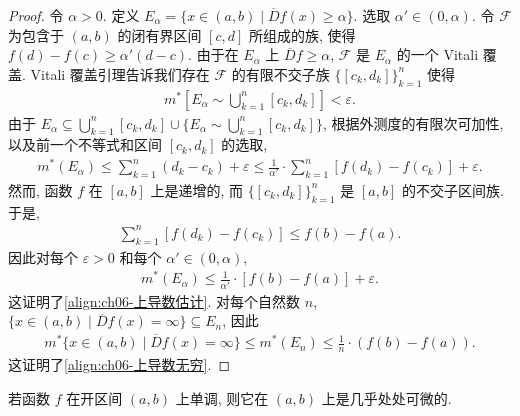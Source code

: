 \documentclass[../../main.tex]{subfiles}
\begin{document}
\begin{proof}
令 $\alpha>0$. 定义 $E_{\alpha}=\{x\in(a,b)\mid\overline{D}f(x)\geqslant\alpha\}$. 选取 $\alpha'\in(0,\alpha)$. 令 $\mathcal{F}$ 为包含于 $(a,b)$ 的闭有界区间 $[c,d]$ 所组成的族, 使得 $f(d)-f(c)\geqslant\alpha'(d-c)$. 由于在 $E_{\alpha}$ 上 $\overline{D}f\geqslant\alpha$, $\mathcal{F}$ 是 $E_{\alpha}$ 的一个 Vitali 覆盖. Vitali 覆盖引理告诉我们存在 $\mathcal{F}$ 的有限不交子族 $\{[c_{k},d_{k}]\}_{k=1}^{n}$ 使得
\begin{align*}
m^{*}\left[E_{\alpha}\sim\bigcup_{k=1}^{n}[c_{k},d_{k}]\right]<\varepsilon.
\end{align*}
由于 $E_{\alpha}\subseteq\bigcup_{k=1}^{n}[c_{k},d_{k}]\cup\{E_{\alpha}\sim\bigcup_{k=1}^{n}[c_{k},d_{k}]\}$, 根据外测度的有限次可加性, 以及前一个不等式和区间 $[c_{k},d_{k}]$ 的选取,
\begin{align}
m^{*}(E_{\alpha})\leqslant\sum_{k=1}^{n}(d_{k}-c_{k})+\varepsilon\leqslant\frac{1}{\alpha'}\cdot\sum_{k=1}^{n}[f(d_{k})-f(c_{k})]+\varepsilon.\label{align:ch06-估计1}
\end{align}
然而, 函数 $f$ 在 $[a,b]$ 上是递增的, 而 $\{[c_{k},d_{k}]\}_{k=1}^{n}$ 是 $[a,b]$ 的不交子区间族. 于是,
\begin{align*}
\sum_{k=1}^{n}[f(d_{k})-f(c_{k})]\leqslant f(b)-f(a).
\end{align*}
因此对每个 $\varepsilon>0$ 和每个 $\alpha'\in(0,\alpha)$,
\begin{align*}
m^{*}(E_{\alpha})\leqslant\frac{1}{\alpha'}\cdot[f(b)-f(a)]+\varepsilon.
\end{align*}
这证明了\eqref{align:ch06-上导数估计}. 对每个自然数 $n$, $\{x\in(a,b)\mid\overline{D}f(x)=\infty\}\subseteq E_{n}$, 因此
\begin{align*}
m^{*}\{x\in(a,b)\mid\overline{D}f(x)=\infty\}\leqslant m^{*}(E_{n})\leqslant\frac{1}{n}\cdot(f(b)-f(a)).
\end{align*}
这证明了\eqref{align:ch06-上导数无穷}.
\end{proof}

\begin{theorem}[Lebesgue 定理]\label{theorem:ch06-单调可微}
若函数 $f$ 在开区间 $(a,b)$ 上单调, 则它在 $(a,b)$ 上是几乎处处可微的.
\end{theorem}
\end{document}
